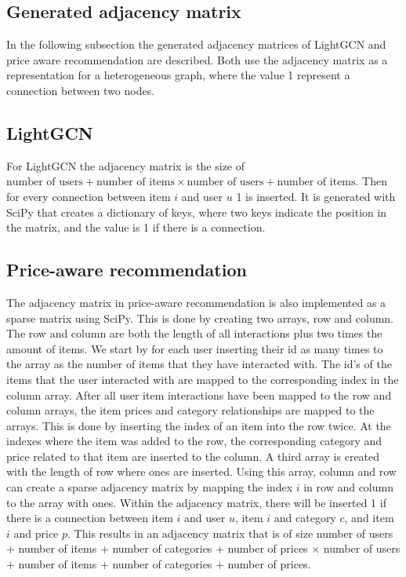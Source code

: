 \subsection{Generated adjacency matrix}
In the following subsection the generated adjacency matrices of LightGCN and price aware recommendation are described.
Both use the adjacency matrix as a representation for a heterogeneous graph, where the value 1 represent a connection between two nodes.

\subsection{LightGCN}
For LightGCN the adjacency matrix is the size of $\textrm{number of users} + \textrm{number of items} \times \textrm{number of users} + \textrm{number of items}$.
Then for every connection between item $i$ and user $u$ 1 is inserted.
It is generated with SciPy that creates a dictionary of keys, where two keys indicate the position in the matrix, and the value is 1 if there is a connection. 

\subsection{Price-aware recommendation}
The adjacency matrix in price-aware recommendation is also implemented as a sparse matrix using SciPy.
This is done by creating two arrays, row and column.
The row and column are both the length of all interactions plus two times the amount of items.
We start by for each user inserting their id as many times to the array as the number of items that they have interacted with.
The id's of the items that the user interacted with are mapped to the corresponding index in the column array.
After all user item interactions have been mapped to the row and column arrays, the item prices and category relationships are mapped to the arrays.
This is done by inserting the index of an item into the row twice.
At the indexes where the item was added to the row, the corresponding category and price related to that item are inserted to the column.
A third array is created with the length of row where ones are inserted.
Using this array, column and row can create a sparse adjacency matrix by mapping the index $i$ in row and column to the array with ones.
Within the adjacency matrix, there will be inserted 1 if there is a connection between item $i$ and user $u$, item $i$ and category $c$, and item $i$ and price $p$.
This results in an adjacency matrix that is of size number of users + number of items + number of categories + number of prices $\times$ number of users + number of items + number of categories + number of prices.
